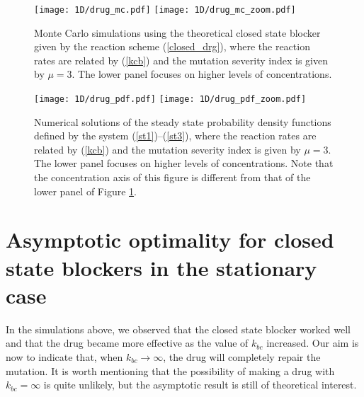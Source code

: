 \begin{figure}[p]\centering
\vbox{
\texttt{[image: 1D/drug\_mc.pdf]}
\texttt{[image: 1D/drug\_mc\_zoom.pdf]}
}
\caption{Monte Carlo simulations using the theoretical closed state blocker given by the reaction scheme (\ref{closed_drg}), where the reaction rates are related by (\ref{kcb}) and the mutation severity index is given by $\mu=3$. The lower panel focuses on higher levels of concentrations. \label{1D/drug_mc}}
\end{figure}


\begin{figure}[p]\centering
\vbox{
\texttt{[image: 1D/drug\_pdf.pdf]}
\texttt{[image: 1D/drug\_pdf\_zoom.pdf]}
}
\caption{Numerical solutions of the steady state probability density functions defined by the system (\ref{st1})--(\ref{st3}), 
 where the reaction rates are related by (\ref{kcb}) and the mutation severity index is given by $\mu=3$. The lower panel focuses on higher levels of concentrations. Note that the concentration axis of this figure is different from that of the lower panel of Figure \ref{1D/drug_mc}. \label{1D/drug_pdf}}
\end{figure}

\section{Asymptotic optimality for closed state blockers in the stationary case}
\label{asymptotic}

In the simulations above, we observed that the closed state blocker worked well and that the drug became more effective as the value of $k_{bc}$ increased.  Our aim is now to indicate that, when $k_{bc}\rightarrow \infty$, the drug will completely repair the mutation. 
It is worth mentioning that the possibility of making a drug with $k_{bc}=\infty$ is quite unlikely, but the asymptotic result is still of theoretical interest.

